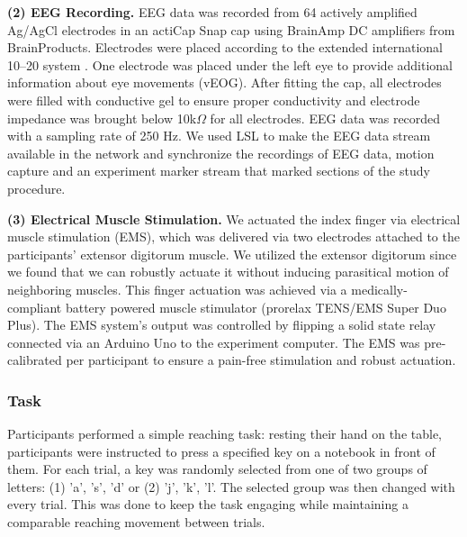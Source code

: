 \indent\textbf{(2) EEG Recording.} EEG data was recorded from 64 actively amplified Ag/AgCl electrodes in an actiCap Snap cap using BrainAmp DC amplifiers from BrainProducts. Electrodes were placed according to the extended international 10–20 system \cite{Chatrian1985-ys}. One electrode was placed under the left eye to provide additional information about eye movements (vEOG). After fitting the cap, all electrodes were filled with conductive gel to ensure proper conductivity and electrode impedance was brought below 10k$\Omega$ for all electrodes. EEG data was recorded with a sampling rate of 250 Hz. We used LSL to make the EEG data stream available in the network and synchronize the recordings of EEG data, motion capture and an experiment marker stream that marked sections of the study procedure.


\indent\textbf{(3) Electrical Muscle Stimulation.} We actuated the index finger via electrical muscle stimulation (EMS), which was delivered via two electrodes attached to the participants' extensor digitorum muscle. We utilized the extensor digitorum since we found that we can robustly actuate it without inducing parasitical motion of neighboring muscles. This finger actuation was achieved via a medically-compliant battery powered muscle stimulator (prorelax TENS/EMS Super Duo Plus). The EMS system's output was controlled by flipping a solid state relay connected via an Arduino Uno to the experiment computer. The EMS was pre-calibrated per participant to ensure a pain-free stimulation and robust actuation.

\subsubsection{Task}
Participants performed a simple reaching task: resting their hand on the table, participants were instructed to press a specified key on a notebook in front of them. For each trial, a key was randomly selected from one of two groups of letters: (1) 'a', 's', 'd' or (2) 'j', 'k', 'l'. The selected group was then changed with every trial. This was done to keep the task engaging while maintaining a comparable reaching movement between trials.

